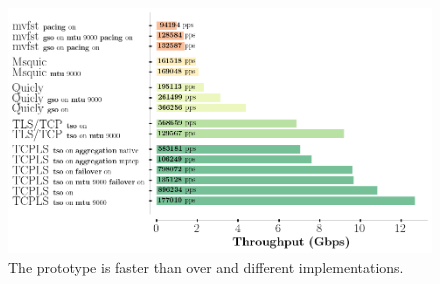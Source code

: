 \begin{figure}[!t]
  \begin{center}
    \includegraphics[width=\columnwidth]{figures/perf_analysis.png}
  \end{center}
\vspace{-0.5cm}
  \caption{The \tcpls prototype is faster than \tls over \tcp and different \quic implementations.}
  \label{fig:perf}
\end{figure}




